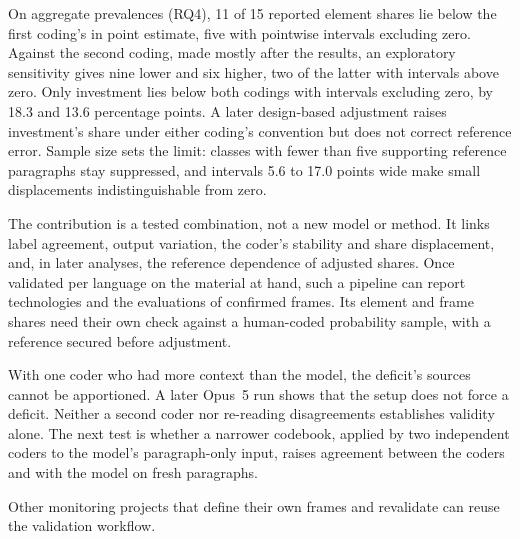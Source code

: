 On aggregate prevalences (RQ4), 11 of 15 reported element shares lie below the first coding's in point estimate, five with pointwise intervals excluding zero. Against the second coding, made mostly after the results, an exploratory sensitivity gives nine lower and six higher, two of the latter with intervals above zero. Only investment lies below both codings with intervals excluding zero, by 18.3 and 13.6 percentage points. A later design-based adjustment raises investment's share under either coding's convention but does not correct reference error. Sample size sets the limit: classes with fewer than five supporting reference paragraphs stay suppressed, and intervals 5.6 to 17.0 points wide make small displacements indistinguishable from zero.

The contribution is a tested combination, not a new model or method. It links label agreement, output variation, the coder's stability and share displacement, and, in later analyses, the reference dependence of adjusted shares. Once validated per language on the material at hand, such a pipeline can report technologies and the evaluations of confirmed frames. Its element and frame shares need their own check against a human-coded probability sample, with a reference secured before adjustment.

With one coder who had more context than the model, the deficit's sources cannot be apportioned. A later Opus~5 run shows that the setup does not force a deficit. Neither a second coder nor re-reading disagreements establishes validity alone. The next test is whether a narrower codebook, applied by two independent coders to the model's paragraph-only input, raises agreement between the coders and with the model on fresh paragraphs.

Other monitoring projects that define their own frames and revalidate can reuse the validation workflow.
